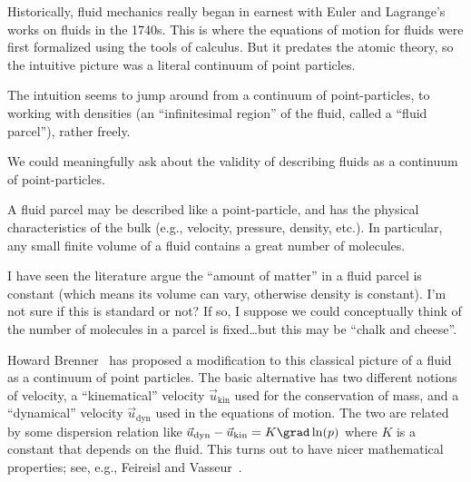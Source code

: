 \begin{node}\label{fluids:describing-0009}%
Historically, fluid mechanics really began in earnest with Euler and
Lagrange's works on fluids in the 1740s. This is where the equations of
motion for fluids were first formalized using the tools of calculus. But
it predates the atomic theory, so the intuitive picture was a literal
continuum of point particles.

The intuition seems to jump around from a continuum of point-particles,
to working with densities (an ``infinitesimal region'' of the fluid,
called a ``fluid parcel''), rather freely.

We could meaningfully ask about the validity of describing fluids as a
continuum of point-particles.

\begin{node}\label{fluids:describing-000A}%
A fluid parcel may be described like a point-particle, and has the
physical characteristics of the bulk (e.g., velocity, pressure, density,
etc.). In particular, any small finite volume of a fluid contains a
great number of molecules.

\begin{node}[Remark]\label{fluids:describing-000B}%
I have seen the literature argue the ``amount of matter'' in a fluid
parcel is constant (which means its volume can vary, otherwise density
is constant). I'm not sure if this is standard or not? If so, I suppose
we could conceptually think of the number of molecules in a parcel is
fixed\dots but this may be ``chalk and cheese''.
\end{node}

\begin{node}\label{fluids:describing-000H}%
Howard Brenner~\cite{brenner2005kinematics,brenner2005navier,brenner2006fluid} has proposed a modification to this classical picture of
a fluid as a continuum of point particles. The basic alternative has two
different notions of velocity, a ``kinematical'' velocity
$\vec{u}_{\text{kin}}$ used for the conservation of mass, and a
``dynamical'' velocity $\vec{u}_{\text{dyn}}$ used in the equations
of motion. The two are related by some dispersion relation like
$\vec{u}_{\text{dyn}}-\vec{u}_{\text{kin}}=K\grad\ln(p)$ where $K$ is a
constant that depends on the fluid. This turns out to have nicer
mathematical properties; see, e.g., Feireisl and Vasseur~\cite{feireisl2010new}.
\end{node}
\end{node}


\end{node}
